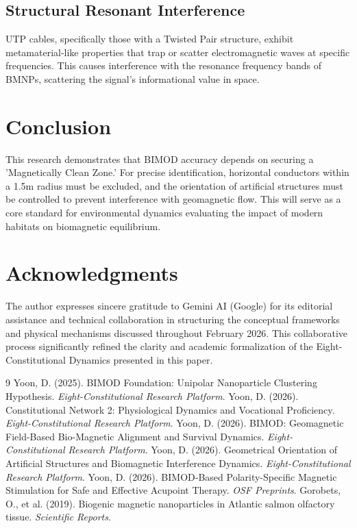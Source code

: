 \documentclass[11pt,a4paper]{article}
\begin{document}
\subsection{Structural Resonant Interference}
UTP cables, specifically those with a Twisted Pair structure, exhibit metamaterial-like properties that trap or scatter electromagnetic waves at specific frequencies. This causes interference with the resonance frequency bands of BMNPs, scattering the signal's informational value in space.

\section{Conclusion}
This research demonstrates that BIMOD accuracy depends on securing a 'Magnetically Clean Zone.' For precise identification, horizontal conductors within a 1.5m radius must be excluded, and the orientation of artificial structures must be controlled to prevent interference with geomagnetic flow. This will serve as a core standard for environmental dynamics evaluating the impact of modern habitats on biomagnetic equilibrium.

\section*{Acknowledgments}
The author expresses sincere gratitude to Gemini AI (Google) for its editorial assistance and technical collaboration in structuring the conceptual frameworks and physical mechanisms discussed throughout February 2026. This collaborative process significantly refined the clarity and academic formalization of the Eight-Constitutional Dynamics presented in this paper.

\begin{thebibliography}{9}
 Yoon, D. (2025). BIMOD Foundation: Unipolar Nanoparticle Clustering Hypothesis. \textit{Eight-Constitutional Research Platform}.
 Yoon, D. (2026). Constitutional Network 2: Physiological Dynamics and Vocational Proficiency. \textit{Eight-Constitutional Research Platform}.
 Yoon, D. (2026). BIMOD: Geomagnetic Field-Based Bio-Magnetic Alignment and Survival Dynamics. \textit{Eight-Constitutional Research Platform}.
 Yoon, D. (2026). Geometrical Orientation of Artificial Structures and Biomagnetic Interference Dynamics. \textit{Eight-Constitutional Research Platform}.
 Yoon, D. (2026). BIMOD-Based Polarity-Specific Magnetic Stimulation for Safe and Effective Acupoint Therapy. \textit{OSF Preprints}.
 Gorobets, O., et al. (2019). Biogenic magnetic nanoparticles in Atlantic salmon olfactory tissue. \textit{Scientific Reports}.
\end{thebibliography}
\end{document}
